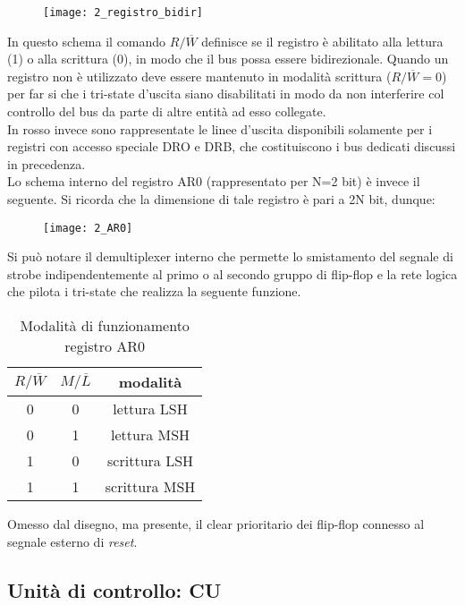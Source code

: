 \begin{figure}[H]
	\centering
	\texttt{[image: 2\_registro\_bidir]}
	\label{fig:registro_bidir}
\end{figure}
\noindent
In questo schema il comando $R/ \overline{W}$ definisce se il registro è abilitato alla lettura (1) o alla scrittura (0), in modo che il bus possa essere bidirezionale. Quando un registro non è utilizzato deve essere mantenuto in modalità scrittura ($R/ \overline{W} = 0$) per far si che i tri-state d'uscita siano disabilitati in modo da non interferire col controllo del bus da parte di altre entità ad esso collegate.
\\
In rosso invece sono rappresentate le linee d'uscita disponibili solamente per i registri con accesso speciale DRO e DRB, che costituiscono i bus dedicati discussi in precedenza.\\
Lo schema interno del registro AR0 (rappresentato per N=2 bit) è invece il seguente. Si ricorda che la dimensione di tale registro è pari a 2N bit, dunque:
\begin{figure}[H]
	\centering
	\texttt{[image: 2\_AR0]}
	\label{fig:AR0}
\end{figure}
\noindent
Si può notare il demultiplexer interno che permette lo smistamento del segnale di strobe indipendentemente al primo o al secondo gruppo di flip-flop e la rete logica che pilota i tri-state che realizza la seguente funzione.
\begin{table}[H]
	\centering
	\fontsize{10}{18}\selectfont
	\begin{tabular}{|p{5mm}|p{5mm}|p{25mm}|}
		\hline
		\multicolumn{1}{|c|}{\textit{$R/\overline{W}$}} &
		\multicolumn{1}{c|}{\textit{$M/\overline{L}$}} & 
		\multicolumn{1}{c|}{\textbf{modalità}}\\
		
		\hline
		\multicolumn{1}{|c|}{0} &
		\multicolumn{1}{|c|}{0} & 
		\multicolumn{1}{c|}{lettura LSH}\\
		
		\hline
		\multicolumn{1}{|c|}{0} &
		\multicolumn{1}{|c|}{1} & 
		\multicolumn{1}{c|}{lettura MSH}\\
		
		\hline
		\multicolumn{1}{|c|}{1} &
		\multicolumn{1}{|c|}{0} & 
		\multicolumn{1}{c|}{scrittura LSH}\\
		
		\hline
		\multicolumn{1}{|c|}{1} &
		\multicolumn{1}{|c|}{1} & 
		\multicolumn{1}{c|}{scrittura MSH}\\ \hline
	\end{tabular}
	\caption{Modalità di funzionamento registro AR0}
\end{table}
\noindent
Omesso dal disegno, ma presente, il clear prioritario dei flip-flop connesso al segnale esterno di \textit{reset}.
\subsection{Unità di controllo: CU}